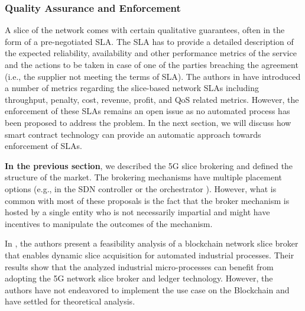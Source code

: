 \subsubsection{Quality Assurance and Enforcement}
A slice of the network comes with certain qualitative guarantees, often in the form of a pre-negotiated \ac{SLA}. The \ac{SLA} has to provide a detailed description of the expected reliability, availability and other performance metrics of the service and the actions to be taken in case of one of the parties breaching the agreement (i.e., the supplier not meeting the terms of SLA). The authors in \cite{SLA-Slicing} have introduced a number of metrics regarding the slice-based network \acp{SLA} including throughput, penalty, cost, revenue, profit, and QoS related metrics. However, the enforcement of these \acp{SLA} remains an open issue as no automated process has been proposed to address the problem. In the next section, we will discuss how smart contract technology can provide an automatic approach towards enforcement of \acp{SLA}.





\textbf{In the previous section}, we described the 5G slice brokering and defined the structure of the market.
The brokering mechanisms have multiple placement options (e.g., in the SDN controller \cite{7794896} or the orchestrator \cite{7514161}). However, what is common with most of these proposals is the fact that the broker mechanism is hosted by a single entity who is not necessarily impartial and might have incentives to manipulate the outcomes of the mechanism.



In \cite{8368983}, the authors present a feasibility analysis of a blockchain network slice broker that enables dynamic slice acquisition for automated industrial processes. Their results show that the analyzed industrial micro-processes can benefit from adopting the 5G network slice broker and ledger technology. However, the authors have not endeavored to implement the use case on the Blockchain and have settled for theoretical analysis.



